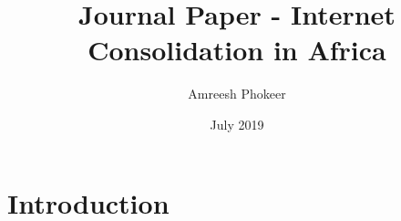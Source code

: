 \documentclass{article}
\title{Journal Paper - Internet Consolidation in Africa}
\author{Amreesh Phokeer}
\date{July 2019}
\begin{document}
\maketitle

\section{Introduction}
\end{document}
